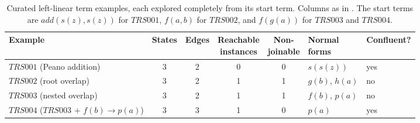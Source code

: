 \begin{table}[t]
\caption{Curated left-linear term examples, each explored completely from its start term. Columns as in . The start terms are $\mathit{add}(s(z),s(z))$ for $TRS001$, $f(a,b)$ for $TRS002$, and $f(g(a))$ for $TRS003$ and $TRS004$.}
\label{tab:curated-trs-summary}
\centering
\smallskip
\small
\setlength{\tabcolsep}{5pt}
\begin{tabular}{@{}lccccll@{}}
\toprule
Example & States & Edges & \shortstack{Reachable\\instances} & \shortstack{Non-\\joinable} & \shortstack{Normal\\forms} & Confluent? \\
\midrule
$TRS001$ (Peano addition) & 3 & 2 & 0 & 0 & $s(s(z))$ & yes \\
$TRS002$ (root overlap) & 3 & 2 & 1 & 1 & $g(b)$, $h(a)$ & no \\
$TRS003$ (nested overlap) & 3 & 2 & 1 & 1 & $f(b)$, $p(a)$ & no \\
$TRS004$ ($TRS003$ $+$ $f(b){\to}p(a)$) & 3 & 3 & 1 & 0 & $p(a)$ & yes \\
\bottomrule
\end{tabular}
\end{table}
